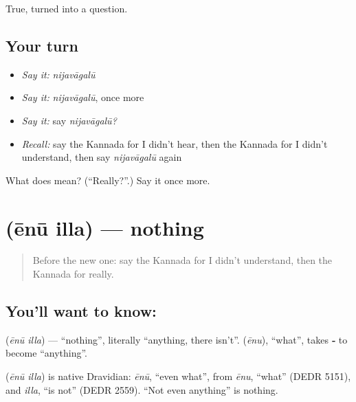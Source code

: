 \begin{grammarlens}[title={What you've built}]
True, turned into a question.
\end{grammarlens}

\subsection*{Your turn}
\begin{itemize}
\raggedright
  \item \emph{Say it:} \emph{nijavāgalū}
  \item \emph{Say it:} \emph{nijavāgalū}, once more
  \item \emph{Say it:} say \emph{nijavāgalū?}
  \item \emph{Recall:} say the Kannada for I didn't hear, then the Kannada for I didn't understand, then say \emph{nijavāgalū} again
\end{itemize}

\begin{tcolorbox}[breakable,colback=teal!4,colframe=teal!35!black,title={Before you move on}]
What does  mean? (\textquotedblleft{}Really?\textquotedblright{}.) Say it once more.
\end{tcolorbox}
\section[\texorpdfstring{\kn{ಏನೂ} \kn{ಇಲ್ಲ} (ēnū illa)}{ಏನೂ ಇಲ್ಲ (ēnū illa)}]{  (ēnū illa) — nothing}

\label{lesson:KA-C87-nothing}



\begin{quote}
Before the new one: say the Kannada for I didn't understand, then the Kannada for really.
\end{quote}

\subsection*{You'll want to know:  }
\textbf{ } (\emph{ēnū illa}) — \textquotedblleft{}nothing\textquotedblright{}, literally \textquotedblleft{}anything, there isn't\textquotedblright{}. \textbf{} (\emph{ēnu}), \textquotedblleft{}what\textquotedblright{}, takes \textbf{‑} to become \textquotedblleft{}anything\textquotedblright{}.

\begin{cousinweb}
\textbf{ } (\emph{ēnū illa}) is native Dravidian: \emph{ēnū}, \textquotedblleft{}even what\textquotedblright{}, from \emph{ēnu}, \textquotedblleft{}what\textquotedblright{} (DEDR 5151), and \emph{illa}, \textquotedblleft{}is not\textquotedblright{} (DEDR 2559). \textquotedblleft{}Not even anything\textquotedblright{} is nothing.
\end{cousinweb}

